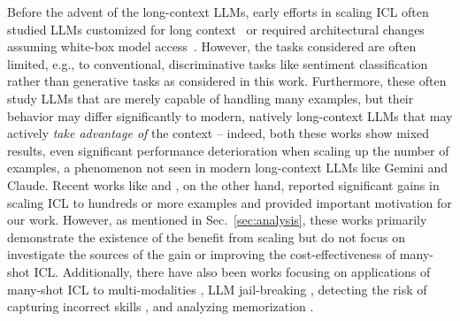 Before the advent of the long-context LLMs, early efforts in scaling ICL often studied LLMs customized for long context~\citep{li2023context} or required architectural changes assuming white-box model access~\citep{hao2022structured}. However, the tasks considered are often limited, e.g., to conventional, discriminative tasks like sentiment classification rather than generative tasks as considered in this work. Furthermore, these often study LLMs that are merely capable of handling many examples, but their behavior may differ significantly to modern, natively long-context LLMs that may actively \textit{take advantage of} the context -- indeed, both these works show mixed results, even significant performance deterioration when scaling up the number of examples, a phenomenon not seen in modern long-context LLMs like Gemini and Claude. Recent works like \citet{agarwal2024many} and \citet{bertsch2024context}, on the other hand, reported significant gains in scaling ICL to hundreds or more examples and provided important motivation for our work. However, as mentioned in Sec.~\ref{sec:analysis}, these works primarily demonstrate the existence of the benefit from scaling but do not focus on investigate the sources of the gain or improving the cost-effectiveness of many-shot ICL.
Additionally, there have also been works focusing on {applications} of many-shot ICL to multi-modalities \citep{jiang2024many}, LLM jail-breaking \citep{anil2024many}, detecting the risk of capturing incorrect skills \citep{liu2024dual}, and analyzing memorization \citep{golchin2024memorization}.


